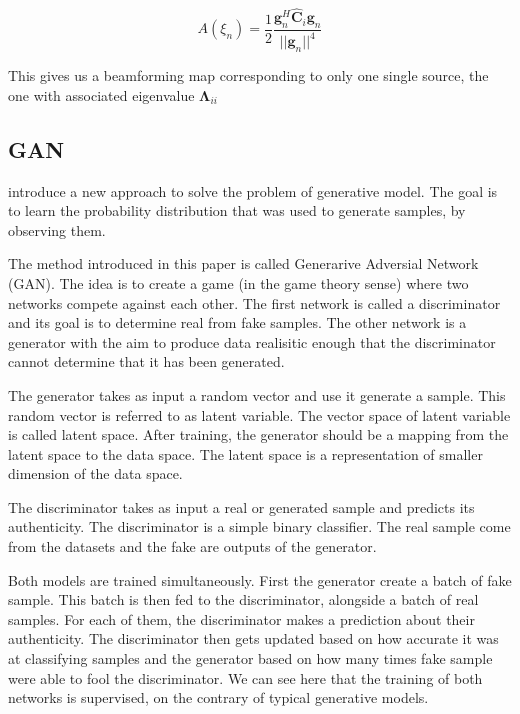 \documentclass{article}
\begin{document}
\begin{equation}
    A(\xi_n) = \frac{1}{2} \frac{\mathbf{g}_{n}^H \hat{\mathbf{C}}_i \mathbf{g}_{n}}{||\mathbf{g}_{n}||^4}
\end{equation}

This gives us a beamforming map corresponding to only one single source, the one with associated eigenvalue $\mathbf{\Lambda}_{ii}$


\subsection{GAN}

\cite{goodfellow2020generative} introduce a new approach to solve the problem of generative model. The goal is to learn the probability distribution that was used to generate samples, by observing them.

The method introduced in this paper is called Generarive Adversial Network (GAN). The idea is to create a game (in the game theory sense) where two networks compete against each other. The first network is called a discriminator and its goal is to determine real from fake samples. The other network is a  generator with the aim to produce data realisitic enough that the discriminator cannot determine that it has been generated.

The generator takes as input a random vector and use it generate a sample. This random vector is referred to as latent variable. The vector space of latent variable is called latent space. After training, the generator should be a mapping from the latent space to the data space. The latent space is  a representation of smaller dimension of the data space.

The discriminator takes as input a real or generated sample and predicts its authenticity. The discriminator is a simple binary classifier. The real sample come from the datasets and the fake are outputs of the generator.

Both models are trained simultaneously. First the generator create a batch of fake sample. This batch is then fed to the discriminator, alongside a batch of real samples. For each of them, the discriminator makes a prediction about their authenticity. The discriminator then gets updated based on how accurate it was at classifying samples and the generator based on how many times fake sample were able to fool the discriminator. We can see here that the training of both networks is supervised, on the contrary of typical generative models.
\end{document}
